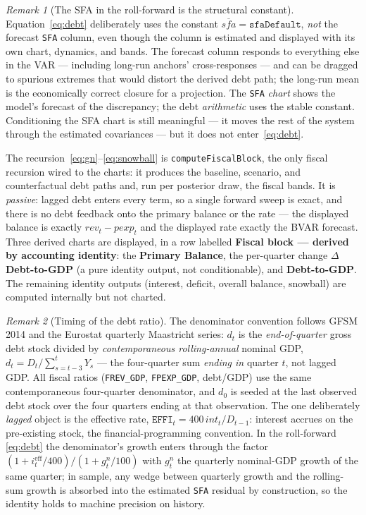\documentclass[11pt]{article}
\newcommand{\ui}[1]{\textbf{#1}}
\theoremstyle{plain}
\theoremstyle{remark}
\newtheorem{remark}{Remark}
\begin{document}
\begin{remark}[The SFA in the roll-forward is the structural constant]\label{rem:sfa}
Equation~\eqref{eq:debt} deliberately uses the constant
$\overline{\mathit{sfa}} = \texttt{sfaDefault}$, \emph{not} the
forecast \texttt{SFA} column, even though the column is estimated and
displayed with its own chart, dynamics, and bands. The forecast column
responds to everything else in the VAR --- including long-run anchors'
cross-responses --- and can be dragged to spurious extremes that would
distort the derived debt path; the long-run mean is the economically
correct closure for a projection. The \texttt{SFA} \emph{chart} shows
the model's forecast of the discrepancy; the debt \emph{arithmetic}
uses the stable constant. Conditioning the SFA chart is still
meaningful --- it moves the rest of the system through the estimated
covariances --- but it does not enter~\eqref{eq:debt}.
\end{remark}

The recursion~\eqref{eq:gn}--\eqref{eq:snowball} is
\texttt{computeFiscalBlock}, the only fiscal recursion wired to the
charts: it produces the baseline, scenario, and counterfactual debt
paths and, run per posterior draw, the fiscal bands. It is
\emph{passive}: lagged debt enters every term, so a single forward sweep
is exact, and there is no debt feedback onto the primary balance or the
rate --- the displayed balance is exactly
$\mathit{rev}_t - \mathit{pexp}_t$ and the displayed rate exactly the
BVAR forecast. Three derived charts are displayed, in a row labelled
\ui{Fiscal block --- derived by accounting identity}: the
\ui{Primary Balance}, the per-quarter change \ui{$\Delta$ Debt-to-GDP}
(a pure identity output, not conditionable), and \ui{Debt-to-GDP}.
The remaining identity outputs (interest, deficit, overall balance,
snowball) are computed internally but not charted.

\begin{remark}[Timing of the debt ratio]\label{rem:debttiming}
The denominator convention follows GFSM\,2014 and the Eurostat quarterly Maastricht series:
$d_t$ is the \emph{end-of-quarter} gross debt stock divided by \emph{contemporaneous rolling-annual}
nominal GDP, $d_t = D_t/\sum_{s=t-3}^{t} Y_s$ --- the four-quarter sum \emph{ending in} quarter $t$,
not lagged GDP. All fiscal ratios (\texttt{FREV\_GDP}, \texttt{FPEXP\_GDP}, debt/GDP) use the same
contemporaneous four-quarter denominator, and $d_0$ is seeded at the last observed debt stock over
the four quarters ending at that observation. The one deliberately \emph{lagged} object is the
effective rate, $\texttt{EFFI}_t = 400\,\mathit{int}_t/D_{t-1}$: interest accrues on the
pre-existing stock, the financial-programming convention. In the roll-forward \eqref{eq:debt} the
denominator's growth enters through the factor $(1+i^{\text{eff}}_t/400)/(1+g^{n}_t/100)$ with
$g^{n}_t$ the quarterly nominal-GDP growth of the same quarter; in sample, any wedge between
quarterly growth and the rolling-sum growth is absorbed into the estimated \texttt{SFA} residual
by construction, so the identity holds to machine precision on history.
\end{remark}
\end{document}
